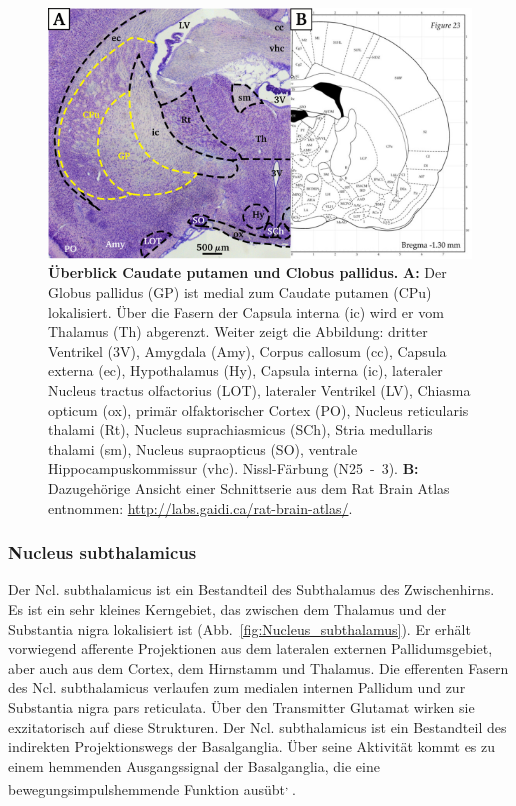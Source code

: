 \begin{figure}[H]
    \centering
    \includegraphics{pictures/Basalganglia/GP_CPu.png}
    \caption[Überblick Caudate putamen und Globus pallidus]{\textbf{Überblick Caudate putamen und Clobus pallidus.} \textbf{A:} Der Globus pallidus (GP) ist medial zum Caudate putamen (CPu) lokalisiert. Über die Fasern der Capsula interna (ic) wird er vom Thalamus (Th) abgerenzt. Weiter zeigt die Abbildung: dritter Ventrikel (3V), Amygdala (Amy), Corpus callosum (cc), Capsula externa (ec), Hypothalamus (Hy), Capsula interna (ic), lateraler Nucleus tractus olfactorius (LOT), lateraler Ventrikel (LV), Chiasma opticum (ox), primär olfaktorischer Cortex (PO),  Nucleus reticularis thalami (Rt), Nucleus suprachiasmicus (SCh), Stria medullaris thalami (sm), Nucleus supraopticus (SO), ventrale Hippocampuskommissur (vhc). Nissl-Färbung (N25~-~3). \textbf{B:} Dazugehörige Ansicht einer Schnittserie aus dem Rat Brain Atlas entnommen: \url{http://labs.gaidi.ca/rat-brain-atlas/}.}
    \label{fig:GP_CPu}
\end{figure}

\subsubsection*{Nucleus subthalamicus} 
Der Ncl. subthalamicus ist ein Bestandteil des Subthalamus des Zwischenhirns. Es ist ein sehr kleines Kerngebiet, das zwischen dem Thalamus und der Substantia nigra lokalisiert ist (Abb.~\ref{fig:Nucleus_subthalamus}). Er erhält vorwiegend afferente Projektionen aus dem lateralen externen Pallidumsgebiet, aber auch aus dem Cortex, dem Hirnstamm und Thalamus. Die efferenten Fasern des Ncl. subthalamicus verlaufen zum medialen internen Pallidum und zur Substantia nigra pars reticulata. Über den Transmitter Glutamat wirken sie exzitatorisch auf diese Strukturen. Der Ncl. subthalamicus ist ein Bestandteil des indirekten Projektionswegs der Basalganglia. Über seine Aktivität kommt es zu einem hemmenden Ausgangssignal der Basalganglia, die eine bewegungsimpulshemmende Funktion ausübt\textsuperscript{\cite[Kap.~43]{kandel2013principles}, \cite[9]{trepel2011neuroanatomie}}.   

